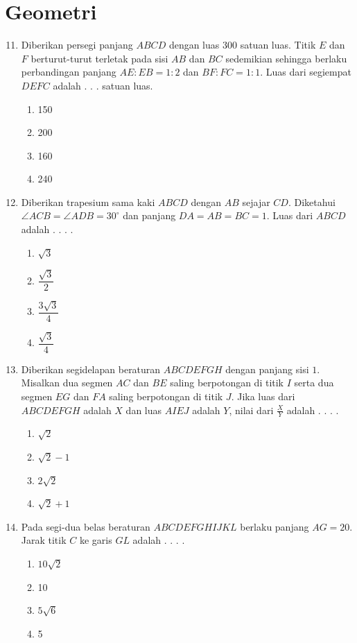 \documentclass[12pt]{scrartcl}
\begin{document}
\section*{Geometri}
\begin{enumerate}[label={Soal \arabic*}]
    \setcounter{enumi}{10}
    \item Diberikan persegi panjang $ABCD$ dengan luas $300$ satuan luas. Titik $E$ dan $F$ berturut-turut terletak pada sisi $AB$ dan $BC$ sedemikian sehingga berlaku perbandingan panjang $AE:EB=1:2$ dan $BF:FC=1:1$. Luas dari segiempat $DEFC$ adalah . . . satuan luas.
    \begin{enumerate}[label={(\Alph*)}]
        \item 150 \item 200 \item 160 \item 240
    \end{enumerate}

    \item Diberikan trapesium sama kaki $ABCD$ dengan $AB$ sejajar $CD$. Diketahui $\angle ACB=\angle ADB=30^\circ$ dan panjang $DA=AB=BC=1$. Luas dari $ABCD$ adalah . . . .
    \begin{enumerate}[label={(\Alph*)}]
        \item $\sqrt{3}$ \item $\dfrac{\sqrt{3}}{2}$ \item $\dfrac{3\sqrt{3}}{4}$ \item $\dfrac{\sqrt{3}}{4}$
    \end{enumerate}

    \item Diberikan segidelapan beraturan $ABCDEFGH$ dengan panjang sisi $1$. Misalkan dua segmen $AC$ dan $BE$ saling berpotongan di titik $I$ serta dua segmen $EG$ dan $FA$ saling berpotongan di titik $J$. Jika luas dari $ABCDEFGH$ adalah $X$ dan luas $AIEJ$ adalah $Y$, nilai dari $\frac{X}{Y}$ adalah . . . .
    \begin{enumerate}[label={(\Alph*)}]
        \item $\sqrt{2}$ \item $\sqrt{2}-1$ \item $2\sqrt{2}$ \item $\sqrt{2}+1$
    \end{enumerate}

    \item Pada segi-dua belas beraturan $ABCDEFGHIJKL$ berlaku panjang $AG=20$. Jarak titik $C$ ke garis $GL$ adalah . . . .
    \begin{enumerate}[label={(\Alph*)}]
        \item $10\sqrt{2}$ \item 10 \item $5\sqrt{6}$ \item 5
    \end{enumerate}


\end{enumerate}
\end{document}

